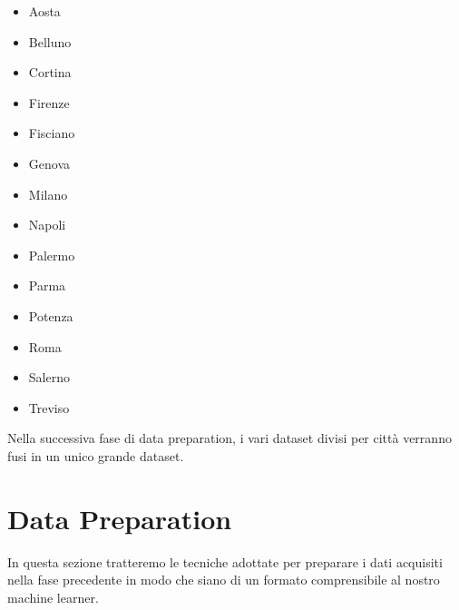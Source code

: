 \documentclass[a4paper, 11pt, oneside]{report}
\begin{document}
                \begin{itemize}
                    \item Aosta
                    \item Belluno
                    \item Cortina
                    \item Firenze
                    \item Fisciano
                    \item Genova
                    \item Milano
                    \item Napoli
                    \item Palermo
                    \item Parma
                    \item Potenza
                    \item Roma
                    \item Salerno
                    \item Treviso
                \end{itemize}
            Nella successiva fase di data preparation, i vari dataset divisi per città verranno fusi in un unico grande
            dataset.

            \newpage
            \section{Data Preparation}
            In questa sezione tratteremo le tecniche adottate per preparare i dati acquisiti nella fase precedente in
            modo che siano di un formato comprensibile al nostro machine learner.
\end{document}
